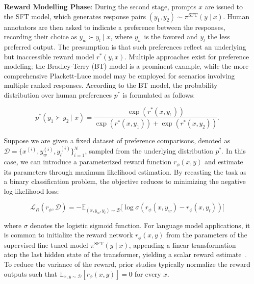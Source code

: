 \textbf{Reward Modelling Phase}: During the second stage, prompts $x$ are issued to the SFT model, which generates response pairs $(y_1, y_2)\sim \pi^\text{SFT}(y \mid x)$. Human annotators are then asked to indicate a preference between the responses, recording their choice as $y_w\succ y_l \mid x$, where $y_w$ is the favored and $y_l$ the less preferred output. The presumption is that such preferences reflect an underlying but inaccessible reward model $r^*(y, x)$. Multiple approaches exist for preference modeling; the Bradley-Terry (BT) model \cite{bradley1952rankanalysis} is a prominent example, while the more comprehensive Plackett-Luce model \citep{plackett1975analysis, luce2012individual} may be employed for scenarios involving multiple ranked responses. According to the BT model, the probability distribution over human preferences $p^*$ is formulated as follows:

\begin{equation}\label{eq:bradley-terry}
    p^*(y_1\succ y_2 \mid x)=\frac{\exp\left(r^*(x, y_1)\right)}{\exp\left(r^*(x, y_1)\right) + \exp\left(r^*(x, y_2)\right)}.
\end{equation}

Suppose we are given a fixed dataset of preference comparisons, denoted as $\mathcal{D}=\bigl\{x^{(i)}, y_w^{(i)}, y_l^{(i)}\bigr\}_{i=1}^N$, sampled from the underlying distribution $p^*$. In this case, we can introduce a parameterized reward function $r_{\phi}(x, y)$ and estimate its parameters through maximum likelihood estimation. By recasting the task as a binary classification problem, the objective reduces to minimizing the negative log-likelihood loss:

\begin{equation}\label{eq:reward_model}
    \mathcal{L}_R(r_{\phi}, \mathcal{D}) = -\mathbb{E}_{(x, y_w, y_l)\sim \mathcal{D}}\bigl[\log \sigma(r_{\phi}(x, y_w)- r_{\phi}(x, y_l))\bigr]
\end{equation}

where $\sigma$ denotes the logistic sigmoid function. For language model applications, it is common to initialize the reward network $r_{\phi}(x, y)$ from the parameters of the supervised fine-tuned model $\pi^\text{SFT}(y \mid x)$, appending a linear transformation atop the last hidden state of the transformer, yielding a scalar reward estimate~\cite{ziegler2020finetuning}. To reduce the variance of the reward, prior studies typically normalize the reward outputs such that $\mathbb{E}_{x,y\sim \mathcal{D}}\left[r_\phi(x, y)\right] = 0$ for every $x$.


